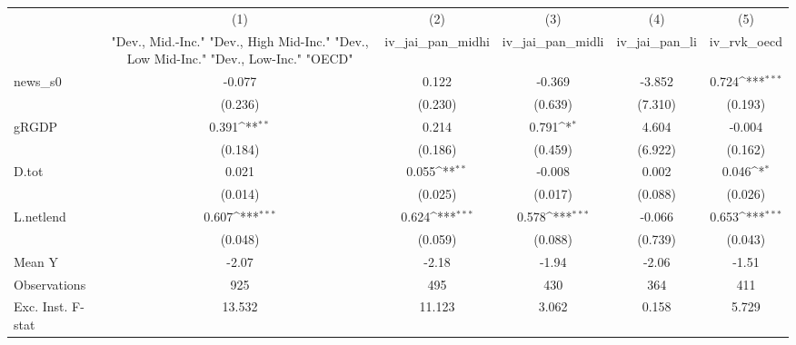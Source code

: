 {
\def\sym#1{\ifmmode^{#1}\else\(^{#1}\)\fi}
\begin{tabular}{l*{5}{c}}
\toprule
            &\multicolumn{1}{c}{(1)}&\multicolumn{1}{c}{(2)}&\multicolumn{1}{c}{(3)}&\multicolumn{1}{c}{(4)}&\multicolumn{1}{c}{(5)}\\
            &\multicolumn{1}{c}{ "Dev., Mid.-Inc." "Dev., High Mid-Inc." "Dev., Low Mid-Inc." "Dev., Low-Inc." "OECD" }&\multicolumn{1}{c}{iv\_jai\_pan\_midhi}&\multicolumn{1}{c}{iv\_jai\_pan\_midli}&\multicolumn{1}{c}{iv\_jai\_pan\_li}&\multicolumn{1}{c}{iv\_rvk\_oecd}\\
\midrule
news\_s0     &      -0.077         &       0.122         &      -0.369         &      -3.852         &       0.724\sym{***}\\
            &     (0.236)         &     (0.230)         &     (0.639)         &     (7.310)         &     (0.193)         \\
\addlinespace
gRGDP       &       0.391\sym{**} &       0.214         &       0.791\sym{*}  &       4.604         &      -0.004         \\
            &     (0.184)         &     (0.186)         &     (0.459)         &     (6.922)         &     (0.162)         \\
\addlinespace
D.tot       &       0.021         &       0.055\sym{**} &      -0.008         &       0.002         &       0.046\sym{*}  \\
            &     (0.014)         &     (0.025)         &     (0.017)         &     (0.088)         &     (0.026)         \\
\addlinespace
L.netlend   &       0.607\sym{***}&       0.624\sym{***}&       0.578\sym{***}&      -0.066         &       0.653\sym{***}\\
            &     (0.048)         &     (0.059)         &     (0.088)         &     (0.739)         &     (0.043)         \\
\midrule
Mean Y      &       -2.07         &       -2.18         &       -1.94         &       -2.06         &       -1.51         \\
Observations&         925         &         495         &         430         &         364         &         411         \\
Exc. Inst. F-stat&      13.532         &      11.123         &       3.062         &       0.158         &       5.729         \\
\bottomrule
\end{tabular}
}

